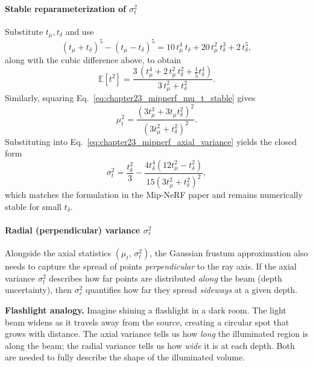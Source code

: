 \begin{enrichment}
\begin{enrichment}
    \paragraph{Stable reparameterization of $\sigma_t^2$}  
    Substitute $t_\mu, t_\delta$ and use
    \[
    (t_\mu + t_\delta)^5 - (t_\mu - t_\delta)^5
    = 10\,t_\mu^4\,t_\delta + 20\,t_\mu^2\,t_\delta^3 + 2\,t_\delta^5,
    \]
    along with the cubic difference above, to obtain
    \[
    \mathbb{E}[t^2]
    = \frac{3\,(t_\mu^4 + 2\,t_\mu^2\,t_\delta^2 + \tfrac{1}{5}t_\delta^4)}
    {3\,t_\mu^2 + t_\delta^2}.
    \]
    Similarly, squaring Eq.~\ref{eq:chapter23_mipnerf_mu_t_stable} gives
    \[
    \mu_t^2
    = \frac{(3t_\mu^3 + 3t_\mu t_\delta^2)^2}{(3t_\mu^2 + t_\delta^2)^2}.
    \]
    Substituting into Eq.~\ref{eq:chapter23_mipnerf_axial_variance} yields the closed form
    \begin{equation}
        \sigma_t^2
        = \frac{t_\delta^2}{3}
        - \frac{4 t_\delta^4 \left( 12 t_\mu^2 - t_\delta^2 \right)}
        {15 \left( 3 t_\mu^2 + t_\delta^2 \right)^2},
        \label{eq:chapter23_mipnerf_sigma_t}
    \end{equation}
    which matches the formulation in the Mip-NeRF paper and remains numerically stable for small $t_\delta$.
    
    \paragraph{Radial (perpendicular) variance $\sigma_r^2$}  
    Alongside the axial statistics $(\mu_t,\,\sigma_t^2)$, the Gaussian frustum approximation also needs to capture the spread of points \emph{perpendicular} to the ray axis.  
    If the axial variance $\sigma_t^2$ describes how far points are distributed \emph{along} the beam (depth uncertainty), then $\sigma_r^2$ quantifies how far they spread \emph{sideways} at a given depth.
    
    \noindent
    \textbf{Flashlight analogy.}  
    Imagine shining a flashlight in a dark room. The light beam widens as it travels away from the source, creating a circular spot that grows with distance.  
    The axial variance tells us how \emph{long} the illuminated region is along the beam; the radial variance tells us how \emph{wide} it is at each depth.  
    Both are needed to fully describe the shape of the illuminated volume.
    

\end{enrichment}
\end{enrichment}
